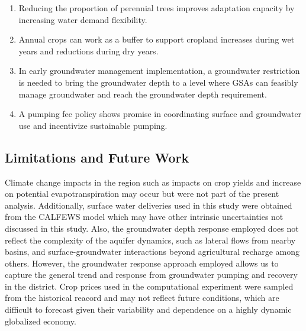 \documentclass[a4paper,fleqn]{cas-sc}
\begin{document}
\begin{enumerate}
    \item   Reducing the proportion of perennial trees improves adaptation capacity by increasing water demand flexibility.  
    \item  Annual crops can work as a buffer to support cropland increases during wet years and reductions during dry years.
    \item  In early groundwater management implementation, a groundwater restriction is needed to bring the groundwater depth to a level where GSAs can feasibly manage groundwater and reach the groundwater depth requirement.
    \item  A pumping fee policy shows promise in coordinating surface and groundwater use and incentivize sustainable pumping. 
\end{enumerate}


\subsection{Limitations and Future Work}

Climate change impacts in the region such as impacts on crop yields \citep{blanc_is_2017} and increase on potential evapotranspiration \citep{mcevoy_projected_2020,vahmani_will_2022} may occur but were not part of the present analysis. Additionally, surface water deliveries used in this study were obtained from the CALFEWS model \citep{zeff_californias_2021} which may have other intrinsic uncertainties not discussed in this study. Also, the groundwater depth response employed does not reflect the complexity of the aquifer dynamics, such as lateral flows from nearby basins, and surface-groundwater interactions beyond agricultural recharge among others. However, the groundwater response approach employed allows us to capture the general trend and response from groundwater pumping and recovery in the district. Crop prices used in the computational experiment were sampled from the historical reacord and may not reflect future conditions, which are difficult to forecast given their variability and dependence on a highly dynamic globalized economy. 
\end{document}
